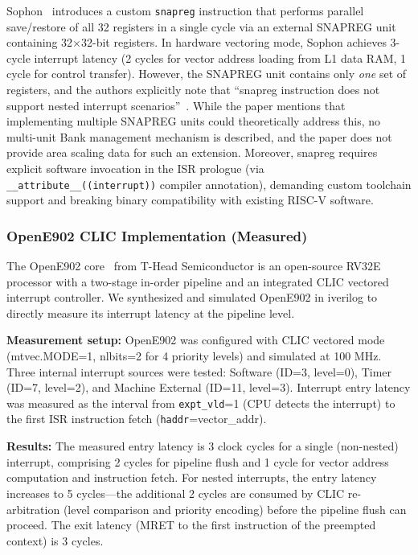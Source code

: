\documentclass[letterpaper,journal]{IEEEtran}
\begin{document}
Sophon~\cite{ref2} introduces a custom \texttt{snapreg} instruction that performs parallel save/restore of all 32 registers in a single cycle via an external SNAPREG unit containing 32$\times$32-bit registers.
In hardware vectoring mode, Sophon achieves 3-cycle interrupt latency (2 cycles for vector address loading from L1 data RAM, 1 cycle for control transfer).
However, the SNAPREG unit contains only \emph{one} set of registers, and the authors explicitly note that ``snapreg instruction does not support nested interrupt scenarios''~\cite{ref2}.
While the paper mentions that implementing multiple SNAPREG units could theoretically address this, no multi-unit Bank management mechanism is described, and the paper does not provide area scaling data for such an extension.
Moreover, snapreg requires explicit software invocation in the ISR prologue (via \texttt{\_\_attribute\_\_((interrupt))} compiler annotation), demanding custom toolchain support and breaking binary compatibility with existing RISC-V software.

\subsubsection{OpenE902 CLIC Implementation (Measured)}

The OpenE902 core~\cite{ref12} from T-Head Semiconductor is an open-source RV32E processor with a two-stage in-order pipeline and an integrated CLIC vectored interrupt controller.
We synthesized and simulated OpenE902 in iverilog to directly measure its interrupt latency at the pipeline level.

\textbf{Measurement setup:} OpenE902 was configured with CLIC vectored mode (mtvec.MODE=1, nlbits=2 for 4 priority levels) and simulated at 100 MHz.
Three internal interrupt sources were tested: Software (ID=3, level=0), Timer (ID=7, level=2), and Machine External (ID=11, level=3).
Interrupt entry latency was measured as the interval from \texttt{expt\_vld}=1 (CPU detects the interrupt) to the first ISR instruction fetch (\texttt{haddr}=vector\_addr).

\textbf{Results:} The measured entry latency is 3 clock cycles for a single (non-nested) interrupt, comprising 2 cycles for pipeline flush and 1 cycle for vector address computation and instruction fetch.
For nested interrupts, the entry latency increases to 5 cycles—the additional 2 cycles are consumed by CLIC re-arbitration (level comparison and priority encoding) before the pipeline flush can proceed.
The exit latency (MRET to the first instruction of the preempted context) is 3 cycles.
\end{document}
